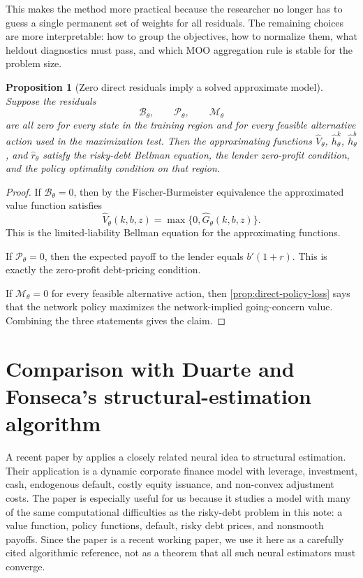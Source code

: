 \documentclass[11pt]{article}
\newtheorem{proposition}{Proposition}
\newcommand{\1}{\mathbf{1}}
\begin{document}
This makes the method more practical because the researcher no longer has to
guess a single permanent set of weights for all residuals. The remaining choices
are more interpretable: how to group the objectives, how to normalize them, what
heldout diagnostics must pass, and which MOO aggregation rule is stable for the
problem size.

\begin{proposition}[Zero direct residuals imply a solved approximate model]
\label{prop:zero-loss-solution}
Suppose the residuals
\[
  \mathcal B_\theta,\qquad \mathcal P_\theta,\qquad \mathcal M_\theta
\]
are all zero for every state in the training region and for every feasible
alternative action used in the maximization test. Then the approximating
functions \(\widehat V_\theta\), \(\widehat h^k_\theta\),
\(\widehat h^b_\theta\), and \(\widehat r_\theta\) satisfy the risky-debt
Bellman equation, the lender zero-profit condition, and the policy optimality
condition on that region.
\end{proposition}

\begin{proof}
If \(\mathcal B_\theta=0\), then by the Fischer-Burmeister equivalence the
approximated value function satisfies
\[
  \widehat V_\theta(k,b,z)
  =
  \max\{0,\widehat G_\theta(k,b,z)\}.
\]
This is the limited-liability Bellman equation for the approximating functions.

If \(\mathcal P_\theta=0\), then the expected payoff to the lender equals
\(b'(1+r)\). This is exactly the zero-profit debt-pricing condition.

If \(\mathcal M_\theta=0\) for every feasible alternative action, then
\cref{prop:direct-policy-loss} says that the network policy maximizes the
network-implied going-concern value. Combining the three statements gives the
claim.
\end{proof}

\section{Comparison with Duarte and Fonseca's structural-estimation algorithm}
\label{sec:duarte-fonseca-comparison}

A recent paper by \citet{duartefonseca2026ai} applies a closely related neural
idea to structural estimation. Their application is a dynamic corporate finance
model with leverage, investment, cash, endogenous default, costly equity
issuance, and non-convex adjustment costs. The paper is especially useful for
us because it studies a model with many of the same computational difficulties
as the risky-debt problem in this note: a value function, policy functions,
default, risky debt prices, and nonsmooth payoffs. Since the paper is a recent
working paper, we use it here as a carefully cited algorithmic reference, not
as a theorem that all such neural estimators must converge.
\end{document}
